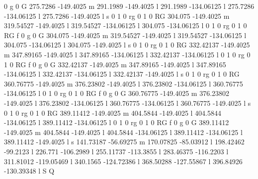 0 g 0 G 
275.7286 -149.4025 m 
291.1989 -149.4025 l 
291.1989 -134.06125 l 
275.7286 -134.06125 l 
275.7286 -149.4025 l 
s 
0 1 0 rg 0 1 0 RG 
304.075 -149.4025 m 
319.54527 -149.4025 l 
319.54527 -134.06125 l 
304.075 -134.06125 l 
0 1 0 rg 0 1 0 RG f 
0 g 0 G 
304.075 -149.4025 m 
319.54527 -149.4025 l 
319.54527 -134.06125 l 
304.075 -134.06125 l 
304.075 -149.4025 l 
s 
0 1 0 rg 0 1 0 RG 
332.42137 -149.4025 m 
347.89165 -149.4025 l 
347.89165 -134.06125 l 
332.42137 -134.06125 l 
0 1 0 rg 0 1 0 RG f 
0 g 0 G 
332.42137 -149.4025 m 
347.89165 -149.4025 l 
347.89165 -134.06125 l 
332.42137 -134.06125 l 
332.42137 -149.4025 l 
s 
0 1 0 rg 0 1 0 RG 
360.76775 -149.4025 m 
376.23802 -149.4025 l 
376.23802 -134.06125 l 
360.76775 -134.06125 l 
0 1 0 rg 0 1 0 RG f 
0 g 0 G 
360.76775 -149.4025 m 
376.23802 -149.4025 l 
376.23802 -134.06125 l 
360.76775 -134.06125 l 
360.76775 -149.4025 l 
s 
0 1 0 rg 0 1 0 RG 
389.11412 -149.4025 m 
404.5844 -149.4025 l 
404.5844 -134.06125 l 
389.11412 -134.06125 l 
0 1 0 rg 0 1 0 RG f 
0 g 0 G 
389.11412 -149.4025 m 
404.5844 -149.4025 l 
404.5844 -134.06125 l 
389.11412 -134.06125 l 
389.11412 -149.4025 l 
s 
141.73187 -56.69275 m 
170.07825 -85.03912 l 
198.42462 -99.2123 l 
226.771 -106.2989 l 
255.11737 -113.3855 l 
283.46375 -116.2203 l 
311.81012 -119.05469 l 
340.1565 -124.72386 l 
368.50288 -127.55867 l 
396.84926 -130.39348 l 
S 
Q
